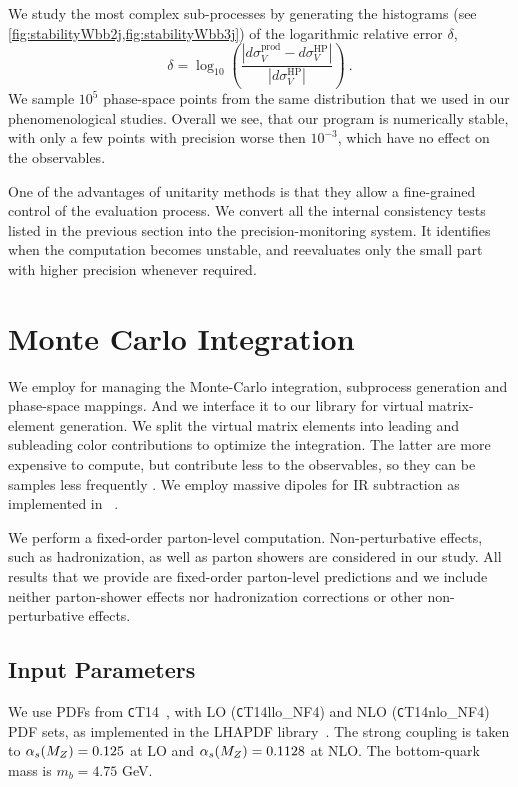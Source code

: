 We study the most complex sub-processes
by generating the histograms (see \cref{fig:stabilityWbb2j,fig:stabilityWbb3j}) of the logarithmic relative error $\delta$,
\begin{equation}
  \delta = \log_{10}\left(\frac{\left|d\sigma^{\text{prod}}_V - d\sigma^{\text{HP}}_V\right|}{\left|d\sigma^{\text{HP}}_V\right|}\right)\ .
  \label{reldiff}
\end{equation}
We sample $10^5$ phase-space points from the same distribution that we used in our phenomenological studies.
Overall we see, that our program is numerically stable,
with only a few points with precision worse then $10^{-3}$,
which have no effect on the observables.

One of the advantages of unitarity methods is that they allow a fine-grained control of the evaluation process.
We convert all the internal consistency tests listed in the previous section into
the precision-monitoring system.  
It identifies when the computation becomes unstable, and reevaluates
only the small part with higher precision whenever required.



\section{Monte Carlo Integration}
\label{sec:wbb:mc_integration}



We employ \SHERPA{}\cite{Sherpa} for managing the Monte-Carlo integration,
subprocess generation and phase-space mappings.
And we interface it to our library for virtual matrix-element generation.
We split the virtual matrix elements into leading and subleading color contributions
to optimize the integration. The latter are more expensive to compute, but contribute less to the observables,
so they can be samples less frequently \cite{BH:W3jDistributions,Ita:2011ar}.
We employ massive dipoles \cite{Catani2002} for IR subtraction as implemented in \COMIX{}~\cite{Comix}.
%

We perform a fixed-order parton-level computation. Non-perturbative effects, such as hadronization, as well as parton showers are considered in our study.
All results that we provide are fixed-order parton-level predictions and we include neither parton-shower effects nor hadronization corrections or other
non-perturbative effects.

\subsection{Input Parameters}
\label{sec:base_setup}
We use PDFs from {\texttt CT14}~\cite{CT14},
with LO ({\texttt CT14llo\_NF4}) and NLO ({\texttt CT14nlo\_NF4}) PDF sets, as
implemented in the LHAPDF library~\cite{LHAPDF}. 
The strong coupling is taken to $\alpha_s(M_Z)=0.125$ at LO and
$\alpha_s(M_Z)=0.1128$ at NLO. 
The bottom-quark mass is $m_b=4.75$ GeV.

